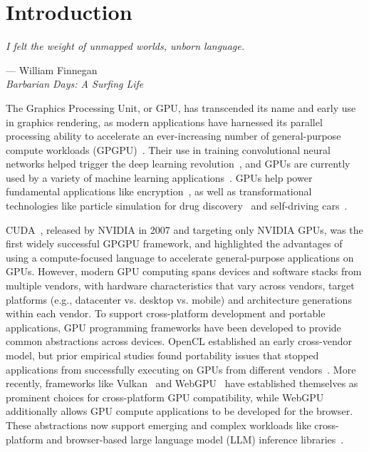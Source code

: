 \chapter[Introduction]{Introduction}
\label{chap:introduction}

\epigraph{\textit{I felt the weight of unmapped worlds, unborn language.}}{--- William Finnegan \\\footnotesize\textit{Barbarian Days: A Surfing Life}}

The Graphics Processing Unit, or GPU, has transcended its name and early use in graphics rendering, as modern applications have harnessed its parallel processing ability to accelerate an ever-increasing number of general-purpose compute workloads (GPGPU)~\cite{owens2007gpgpu}. Their use in training convolutional neural networks helped trigger the deep learning revolution~\cite{krizhevsky2017imagenet}, and GPUs are currently used by a variety of machine learning applications~\cite{reuther2019survey}. GPUs help power fundamental applications like encryption~\cite{ozerk2022encrypt}, as well as transformational technologies like particle simulation for drug discovery~\cite{pandey2022transformational} and self-driving cars~\cite{bojarski2016endendlearningselfdriving}.

CUDA~\cite{cuda}, released by NVIDIA in 2007 and targeting only NVIDIA GPUs, was the first widely successful GPGPU framework, and highlighted the advantages of using a compute-focused language to accelerate general-purpose applications on GPUs. However, modern GPU computing spans devices and software stacks from multiple vendors, with hardware characteristics that vary across vendors, target platforms (e.g., datacenter vs. desktop vs. mobile) and architecture generations within each vendor. To support cross-platform development and portable applications, GPU programming frameworks have been developed to provide common abstractions across devices. OpenCL established an early cross-vendor model, but prior empirical studies found portability issues that stopped applications from successfully executing on GPUs from different vendors~\cite{sorensen2016hitchhiker}. More recently, frameworks like Vulkan~\cite{vulkan} and WebGPU~\cite{webgpu} have established themselves as prominent choices for cross-platform GPU compatibility, while WebGPU additionally allows GPU compute applications to be developed for the browser. These abstractions now support emerging and complex workloads like cross-platform and browser-based large language model (LLM) inference libraries~\cite{ruan2024webllmhighperformanceinbrowserllm,transformersjsDocs,levine2026llamaweb}.

